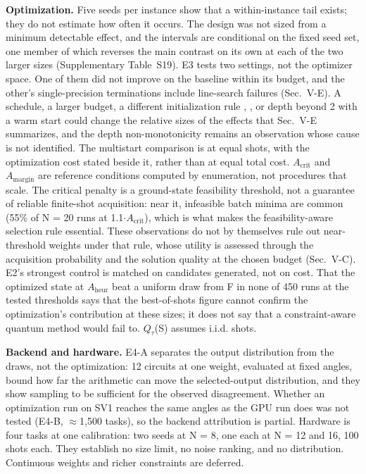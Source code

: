 \documentclass{ieeeaccess}
\begin{document}
\textbf{Optimization.} Five seeds per instance show that a within-instance tail exists; they do not estimate how often it occurs. The design was not sized from a minimum detectable effect, and the intervals are conditional on the fixed seed set, one member of which reverses the main contrast on its own at each of the two larger sizes (Supplementary Table~S19). E3 tests two settings, not the optimizer space. One of them did not improve on the baseline within its budget, and the other's single-precision terminations include line-search failures (Sec.~V-E). A schedule, a larger budget, a different initialization rule \cite{ref32}, \cite{ref33}, or depth beyond 2 with a warm start could change the relative sizes of the effects that Sec.~V-E summarizes, and the depth non-monotonicity remains an observation whose cause is not identified. The multistart comparison is at equal shots, with the optimization cost stated beside it, rather than at equal total cost. $A_{\mathrm{crit}}$ and $A_{\mathrm{margin}}$ are reference conditions computed by enumeration, not procedures that scale. The critical penalty is a ground-state feasibility threshold, not a guarantee of reliable finite-shot acquisition: near it, infeasible batch minima are common (55\% of N = 20 runs at 1.1$\cdot$$A_{\mathrm{crit}}$), which is what makes the feasibility-aware selection rule essential. These observations do not by themselves rule out near-threshold weights under that rule, whose utility is assessed through the acquisition probability and the solution quality at the chosen budget (Sec.~V-C). E2's strongest control is matched on candidates generated, not on cost. That the optimized state at $A_{\mathrm{heur}}$ beat a uniform draw from F in none of 450 runs at the tested thresholds says that the best-of-shots figure cannot confirm the optimization's contribution at these sizes; it does not say that a constraint-aware quantum method would fail to. $Q_{\tau}$(S) assumes i.i.d. shots.


\textbf{Backend and hardware.} E4-A separates the output distribution from the draws, not the optimization: 12 circuits at one weight, evaluated at fixed angles, bound how far the arithmetic can move the selected-output distribution, and they show sampling to be sufficient for the observed disagreement. Whether an optimization run on SV1 reaches the same angles as the GPU run does was not tested (E4-B, $\approx$1,500 tasks), so the backend attribution is partial. Hardware is four tasks at one calibration: two seeds at N = 8, one each at N = 12 and 16, 100 shots each. They establish no size limit, no noise ranking, and no distribution. Continuous weights and richer constraints are deferred.
\end{document}
